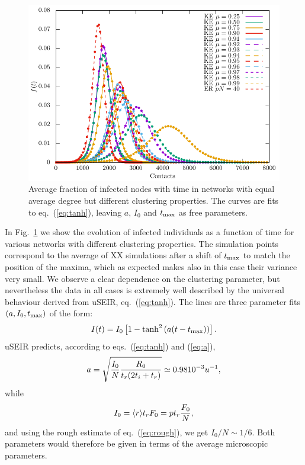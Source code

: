 \documentclass[a4paper,oneside,11pt]{article}
\begin{document}
\begin{figure}[htbp]
\centering
 \includegraphics[width=.9\linewidth]{uSEIR.pdf}
\caption{Average fraction of infected nodes with time in networks with equal average degree but different clustering properties. The curves are fits  to eq.~(\ref{eq:tanh}), leaving $a$, $I_0$ and $t_{\rm max}$ as free parameters. }
\label{fig:net}
\end{figure}
In Fig.~\ref{fig:net} we show the evolution of infected individuals as a function of time for various networks with different clustering properties. The simulation points correspond to the average of XX simulations after a shift of $t_{\rm max}$ to match the position of the maxima, which as expected makes also in this case their variance very  small. We observe a clear dependence on the clustering parameter, but nevertheless the data in all cases is extremely well described by  the universal behaviour  derived from uSEIR, eq.~(\ref{eq:tanh}). The lines
are three parameter fits $(a, I_0, t_{\rm max})$ of the form:
\begin{eqnarray}
I(t)= I_0 \left[ 1 - {\rm tanh}^2 \left(a (t-t_{\rm max}) \right)\right].
\label{eq:iasym}
\end{eqnarray}
uSEIR predicts, according to eqs.~(\ref{eq:tanh}) and (\ref{eq:a}),
\begin{eqnarray}
a=  \sqrt{{I_0\over N} { R_0 \over  t_r(2 t_i + t_r)}} \simeq 0.98 10^{-3} u^{-1},
\label{eq:a}
\end{eqnarray}
while 
\begin{eqnarray}
 I_0 = \langle r \rangle t_r F_0 = p t_r {F_0\over N},
 \end{eqnarray}
 and using the rough estimate of eq.~(\ref{eq:rough}), we get $I_0/N \sim 1/6$. 
 Both parameters would therefore be given in terms of the average microscopic parameters. 
\end{document}
